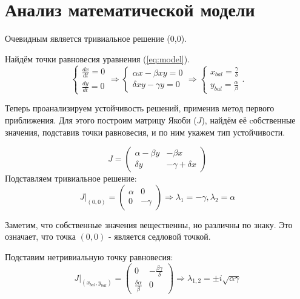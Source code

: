 \chapter{Анализ математической модели}
Очевидным является тривиальное решение (0,0).

Найдём точки равновесия уравнения (\ref{eq:model}).
 \begin{equation}
	\begin{cases}
		\frac{dx}{dt} = 0 \\ 
		\frac{dy}{dt} = 0
	\end{cases}
	\Rightarrow
	\begin{cases}
			\alpha x - \beta x y = 0\\
			\delta x y  - \gamma y = 0
	\end{cases}
	\Rightarrow
	\begin{cases}
		x_{bal} = \frac{\gamma}{\delta}\\
		y_{bal} = \frac{\alpha}{\beta}
	\end{cases}
	.
	\label{eq:balance_points}
\end{equation}

Теперь проанализируем устойчивость решений, применив метод первого приближения. 
Для этого построим матрицу Якоби (\textbf{$J$}), найдём её cобственные значения, подставив точки равновесия, и по ним укажем тип устойчивости.

\begin{equation}
	J = \begin{pmatrix}
		\alpha - \beta y & - \beta x \\
		\delta y & - \gamma + \delta x
		\label{eq:jacobi}
	\end{pmatrix}
\end{equation}
Подставляем тривиальное решение:
\begin{equation}
	J\big|_{(0,0)} = 
	\begin{pmatrix}
		\alpha & 0 \\
		0 & -\gamma
	\end{pmatrix}
	\Rightarrow \lambda_1 = -\gamma , \lambda_2 = \alpha
	\label{eq:EV_triv}
\end{equation}

Заметим, что собственные значения вещественны, но различны по знаку. 
Это означает, что точка $(0,0)$ - является седловой точкой.

Подставим нетривиальную точку равновесия:
\begin{equation}
	J\big|_{(x_{bal},y_{bal})} = 
	\begin{pmatrix}
		0 &  - \frac{\beta \gamma}{\delta} \\
		\frac{\delta \alpha}{\beta} & 0
	\end{pmatrix}
	\Rightarrow \lambda_{1,2} = \pm i \sqrt{\alpha\gamma}
	\label{eq:EV_bal}
\end{equation}

